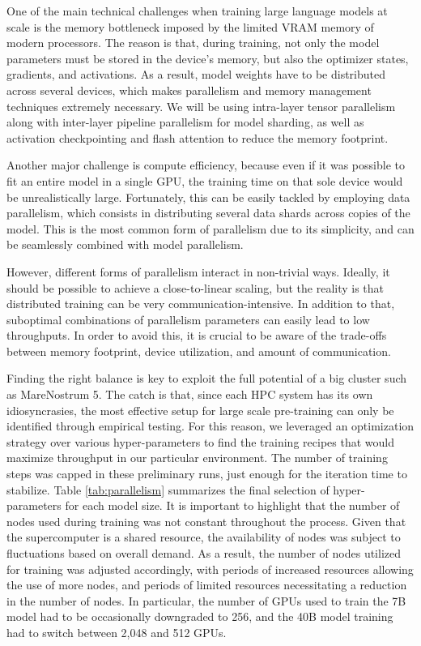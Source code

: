 One of the main technical challenges when training large language models at scale is the memory bottleneck imposed by the limited VRAM memory of modern processors. The reason is that, during training, not only the model parameters must be stored in the device's memory, but also the optimizer states, gradients, and activations. As a result, model weights have to be distributed across several devices, which makes parallelism and memory management techniques extremely necessary. We will be using intra-layer tensor parallelism along with inter-layer pipeline parallelism for model sharding, as well as activation checkpointing and flash attention to reduce the memory footprint. 

Another major challenge is compute efficiency, because even if it was possible to fit an entire model in a single GPU, the training time on that sole device would be unrealistically large. Fortunately, this can be easily tackled by employing data parallelism, which consists in distributing several data shards across copies of the model. This is the most common form of parallelism due to its simplicity, and can be seamlessly combined with model parallelism.

However, different forms of parallelism interact in non-trivial ways. Ideally, it should be possible to achieve a close-to-linear scaling, but the reality is that distributed training can be very communication-intensive. In addition to that, suboptimal combinations of parallelism parameters can easily lead to low throughputs. In order to avoid this, it is crucial to be aware of the trade-offs between memory footprint, device utilization, and amount of communication.

Finding the right balance is key to exploit the full potential of a big cluster such as MareNostrum 5. The catch is that, since each HPC system has its own idiosyncrasies, the most effective setup for large scale pre-training can only be identified through empirical testing. For this reason, we leveraged an optimization strategy over various hyper-parameters to find the training recipes that would maximize throughput in our particular environment. The number of training steps was capped in these preliminary runs, just enough for the iteration time to stabilize. Table \ref{tab:parallelism} summarizes the final selection of hyper-parameters for each model size. It is important to highlight that the number of nodes used during training was not constant throughout the process. Given that the supercomputer is a shared resource, the availability of nodes was subject to fluctuations based on overall demand.  As a result, the number of nodes utilized for training was adjusted accordingly, with periods of increased resources allowing the use of more nodes, and periods of limited resources necessitating a reduction in the number of nodes. In particular, the number of GPUs used to train the 7B model had to be occasionally downgraded to 256, and the 40B model training had to switch between 2,048 and 512 GPUs. 

